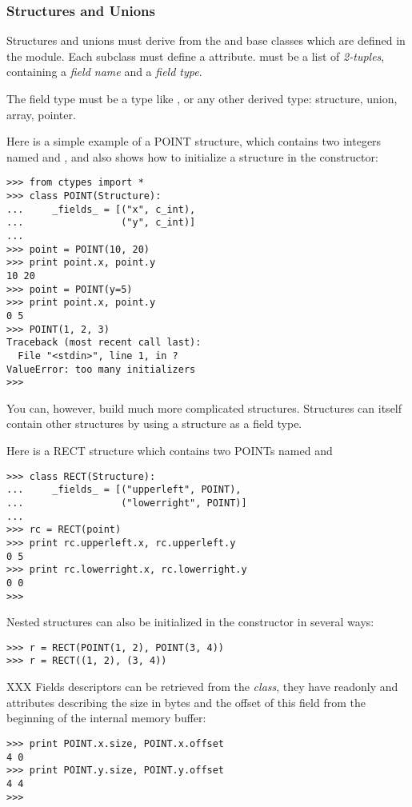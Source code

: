 \subsubsection{Structures and Unions\label{ctypes-structures-unions}}

Structures and unions must derive from the  and 
base classes which are defined in the  module. Each subclass
must define a  attribute.   must be a list of
\emph{2-tuples}, containing a \emph{field name} and a \emph{field type}.

The field type must be a  type like , or any other
derived  type: structure, union, array, pointer.

Here is a simple example of a POINT structure, which contains two
integers named  and , and also shows how to initialize a
structure in the constructor:
\begin{verbatim}
>>> from ctypes import *
>>> class POINT(Structure):
...     _fields_ = [("x", c_int),
...                 ("y", c_int)]
...
>>> point = POINT(10, 20)
>>> print point.x, point.y
10 20
>>> point = POINT(y=5)
>>> print point.x, point.y
0 5
>>> POINT(1, 2, 3)
Traceback (most recent call last):
  File "<stdin>", line 1, in ?
ValueError: too many initializers
>>>
\end{verbatim}

You can, however, build much more complicated structures. Structures
can itself contain other structures by using a structure as a field
type.

Here is a RECT structure which contains two POINTs named 
and 
\begin{verbatim}
>>> class RECT(Structure):
...     _fields_ = [("upperleft", POINT),
...                 ("lowerright", POINT)]
...
>>> rc = RECT(point)
>>> print rc.upperleft.x, rc.upperleft.y
0 5
>>> print rc.lowerright.x, rc.lowerright.y
0 0
>>>
\end{verbatim}

Nested structures can also be initialized in the constructor in
several ways:
\begin{verbatim}
>>> r = RECT(POINT(1, 2), POINT(3, 4))
>>> r = RECT((1, 2), (3, 4))
\end{verbatim}

XXX Fields descriptors can be retrieved from the \emph{class}, they
have readonly  and  attributes describing the size
in bytes and the offset of this field from the beginning of the
internal memory buffer:
\begin{verbatim}
>>> print POINT.x.size, POINT.x.offset
4 0
>>> print POINT.y.size, POINT.y.offset
4 4
>>>
\end{verbatim}

